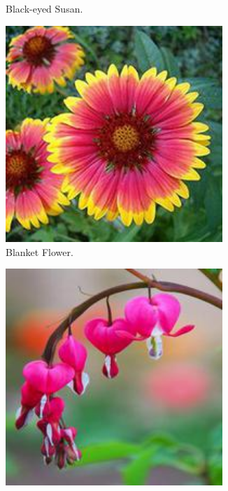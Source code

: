 \begin{figure}
\begin{subfigure}{0.24\textwidth}
        \caption{Black-eyed Susan.}
    \end{subfigure}
    \vspace{0.07cm}
    \begin{subfigure}{0.24\textwidth}
        \centering
        \includegraphics[width=0.9\textwidth]{../example_images/BlanketFlower.jpg}
        \caption{Blanket Flower.}
    \end{subfigure}
    \vspace{0.07cm}
    \begin{subfigure}{0.24\textwidth}
        \centering
        \includegraphics[width=0.9\textwidth]{../example_images/BleedingHeart.jpg}

\end{subfigure}
\end{figure}
